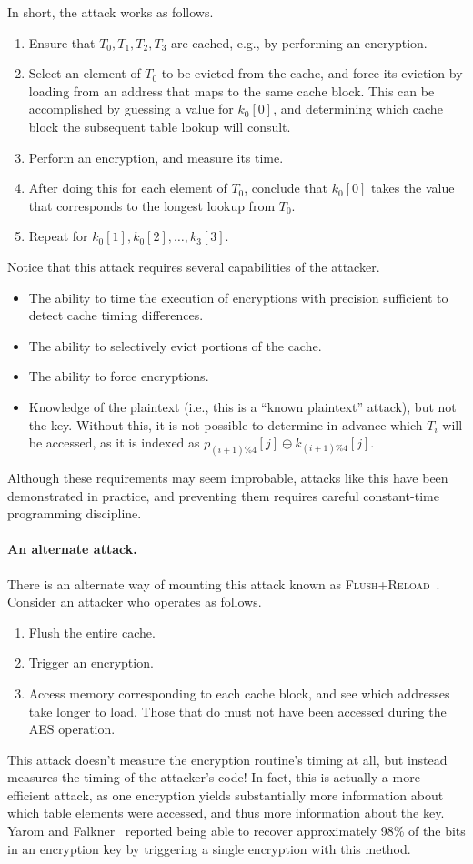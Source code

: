 \documentclass[11pt,twoside]{scrartcl}
\begin{document}
In short, the attack works as follows.
\begin{enumerate}
\item Ensure that $T_0,T_1,T_2,T_3$ are cached, e.g., by performing an encryption.
\item Select an element of $T_0$ to be evicted from the cache, and force its eviction by loading from an address that maps to the same cache block. This can be accomplished by guessing a value for $k_0[0]$, and determining which cache block the subsequent table lookup will consult.
\item Perform an encryption, and measure its time.
\item After doing this for each element of $T_0$, conclude that $k_0[0]$ takes the value that corresponds to the longest lookup from $T_0$.
\item Repeat for $k_0[1], k_0[2], \ldots, k_3[3]$.
\end{enumerate}
Notice that this attack requires several capabilities of the attacker.
\begin{itemize}
\item The ability to time the execution of encryptions with precision sufficient to detect cache timing differences.
\item The ability to selectively evict portions of the cache.
\item The ability to force encryptions.
\item Knowledge of the plaintext (i.e., this is a ``known plaintext'' attack), but not the key. Without this, it is not possible to determine in advance which $T_i$ will be accessed, as it is indexed as $p_{(i+1)\% 4}[j] \oplus k_{(i+1)\%4}[j]$.
\end{itemize}
Although these requirements may seem improbable, attacks like this have been demonstrated in practice, and preventing them requires careful constant-time programming discipline.

\paragraph{An alternate attack.}
There is an alternate way of mounting this attack known as \textsc{Flush+Reload}~\cite{Yarom14}. Consider an attacker who operates as follows.
\begin{enumerate}
\item Flush the entire cache.
\item Trigger an encryption.
\item Access memory corresponding to each cache block, and see which addresses take longer to load. Those that do must not have been accessed during the AES operation.
\end{enumerate}
This attack doesn't measure the encryption routine's timing at all, but instead measures the timing of the attacker's code! In fact, this is actually a more efficient attack, as one encryption yields substantially more information about which table elements were accessed, and thus more information about the key. Yarom and Falkner~\cite{Yarom14} reported being able to recover approximately 98\% of the bits in an encryption key by triggering a single encryption with this method.
\end{document}
